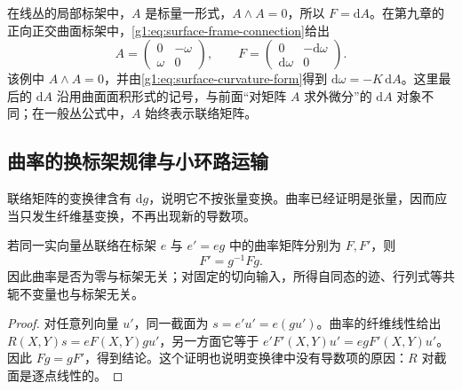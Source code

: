 在线丛的局部标架中，\(A\) 是标量一形式，\(A\wedge A=0\)，所以 \(F=\mathrm{d}A\)。在第九章的正向正交曲面标架中，\eqref{g1:eq:surface-frame-connection}给出
\[
	A=\begin{pmatrix}0&-\omega\\\omega&0\end{pmatrix},\qquad
	F=\begin{pmatrix}0&-\mathrm{d}\omega\\\mathrm{d}\omega&0\end{pmatrix}.
\]
该例中 \(A\wedge A=0\)，并由\eqref{g1:eq:surface-curvature-form}得到 \(\mathrm{d}\omega=-K\,\mathrm{d}A\)。这里最后的 \(\mathrm{d}A\) 沿用曲面面积形式的记号，与前面“对矩阵 \(A\) 求外微分”的 \(\mathrm{d}A\) 对象不同；在一般丛公式中，\(A\) 始终表示联络矩阵。

\subsection{曲率的换标架规律与小环路运输}
\label{g1:subsec:1503:03}

联络矩阵的变换律含有 \(\mathrm{d}g\)，说明它不按张量变换。曲率已经证明是张量，因而应当只发生纤维基变换，不再出现新的导数项。

\begin{proposition}\label{g1:prop:curvature-frame-change}
	若同一实向量丛联络在标架 \(e\) 与 \(e'=eg\) 中的曲率矩阵分别为 \(F,F'\)，则
	\[
		F'=g^{-1}Fg.
	\]
	因此曲率是否为零与标架无关；对固定的切向输入，所得自同态的迹、行列式等共轭不变量也与标架无关。
\end{proposition}
\begin{proof}
	对任意列向量 \(u'\)，同一截面为 \(s=e'u'=e(gu')\)。曲率的纤维线性给出 \(R(X,Y)s=eF(X,Y)g u'\)，另一方面它等于 \(e'F'(X,Y)u'=egF'(X,Y)u'\)。因此 \(Fg=gF'\)，得到结论。这个证明也说明变换律中没有导数项的原因：\(R\) 对截面是逐点线性的。
\end{proof}

